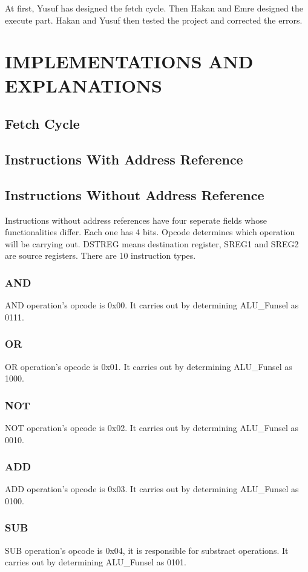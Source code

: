 \documentclass[pdftex,12pt,a4paper]{article}
\begin{document}
At first, Yusuf has designed the fetch cycle. Then Hakan and Emre designed the execute part. Hakan and Yusuf then tested the project and corrected the errors.


\section{IMPLEMENTATIONS AND EXPLANATIONS }
\subsection{Fetch Cycle}

\subsection{Instructions With Address Reference}

\subsection{Instructions Without Address Reference}
    Instructions without address references have four seperate fields whose functionalities differ. Each one has 4 bits. Opcode determines which operation
will be carrying out. DSTREG means destination register, SREG1 and SREG2 are source registers. There are 10 instruction types.
\subsubsection{AND}
    AND operation's opcode is 0x00. It carries out by determining ALU_Funsel as 0111.
\subsubsection{OR}
    OR operation's opcode is 0x01. It carries out by determining ALU_Funsel as 1000.
\subsubsection{NOT}
    NOT operation's opcode is 0x02. It carries out by determining ALU_Funsel as 0010.
\subsubsection{ADD}
    ADD operation's opcode is 0x03. It carries out by determining ALU_Funsel as 0100.
\subsubsection{SUB}
    SUB operation's opcode is 0x04, it is responsible for substract operations. It carries out by determining ALU_Funsel as 0101.
\end{document}
